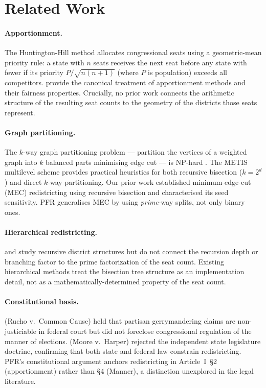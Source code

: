 \section{Related Work}
\label{sec:related}

\paragraph{Apportionment.}
The Huntington-Hill method \citep{huntington1921methods, hill1911method}
allocates congressional seats using a geometric-mean priority rule: a state
with $n$ seats receives the next seat before any state with fewer if its
priority $P / \sqrt{n(n+1)}$ (where $P$ is population) exceeds all competitors.
\citet{balinski2001fair} provide the canonical treatment of apportionment
methods and their fairness properties. Crucially, no prior work connects the
arithmetic structure of the resulting seat counts to the geometry of the
districts those seats represent.

\paragraph{Graph partitioning.}
The $k$-way graph partitioning problem --- partition the vertices of a weighted
graph into $k$ balanced parts minimising edge cut --- is NP-hard
\citep{garey1979computers}. The METIS multilevel scheme
\citep{karypis1998fast} provides practical heuristics for both recursive
bisection ($k = 2^d$) and direct $k$-way partitioning. Our prior work
\citep{dellaLibera2026mec} established minimum-edge-cut (MEC) redistricting
using recursive bisection and characterised its seed sensitivity.
PFR generalises MEC by using \emph{prime}-way splits, not only binary ones.

\paragraph{Hierarchical redistricting.}
\citet{cohen2021making} and \citet{hegeman2020recursive} study recursive
district structures but do not connect the recursion depth or branching factor
to the prime factorization of the seat count. Existing hierarchical methods
treat the bisection tree structure as an implementation detail, not as a
mathematically-determined property of the seat count.

\paragraph{Constitutional basis.}
\citet{rucho2019} (Rucho v.\ Common Cause) held that partisan gerrymandering
claims are non-justiciable in federal court but did not foreclose congressional
regulation of the manner of elections. \citet{moore2023} (Moore v.\ Harper)
rejected the independent state legislature doctrine, confirming that both state
and federal law constrain redistricting. PFR's constitutional argument anchors
redistricting in Article~I~\S2 (apportionment) rather than \S4 (Manner),
a distinction unexplored in the legal literature.

